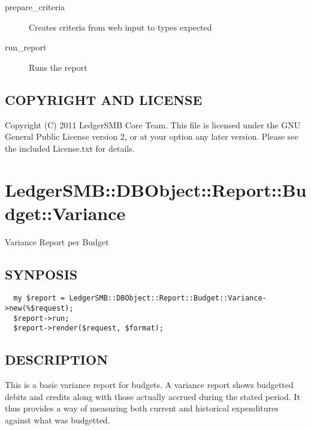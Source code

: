 \begin{description}
\begin{description}
\begin{description}
\begin{description}
\begin{description}
\begin{description}
\begin{description}
\begin{description}
\begin{description}
\begin{description}
\begin{description}
\item[{prepare\_criteria}] \mbox{}

Creates criteria from web input to types expected


\item[{run\_report}] \mbox{}

Runs the report

\end{description}
\subsection*{COPYRIGHT AND LICENSE\label{LedgerSMB::DBObject::Reports::Budget::Search_COPYRIGHT_AND_LICENSE}}


Copyright (C) 2011 LedgerSMB Core Team.  This file is licensed under the GNU 
General Public License version 2, or at your option any later version.  Please
see the included License.txt for details.

\section{LedgerSMB::DBObject::Report::Budget::Variance\label{LedgerSMB::DBObject::Report::Budget::Variance}}


Variance Report per Budget

\subsection*{SYNPOSIS\label{LedgerSMB::DBObject::Report::Budget::Variance_SYNPOSIS}}
\begin{verbatim}
  my $report = LedgerSMB::DBObject::Report::Budget::Variance->new(%$request);
  $report->run;
  $report->render($request, $format);
\end{verbatim}
\subsection*{DESCRIPTION\label{LedgerSMB::DBObject::Report::Budget::Variance_DESCRIPTION}}


This is a basic variance report for budgets.  A variance report shows budgetted
debits and credits along with those actually accrued during the stated period.
It thus provides a way of measuring both current and historical expenditures
against what was budgetted.


\end{description}
\end{description}
\end{description}
\end{description}
\end{description}
\end{description}
\end{description}
\end{description}
\end{description}
\end{description}
